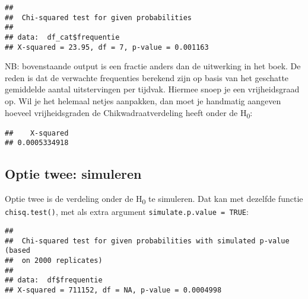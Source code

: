 \documentclass[]{book}
\newenvironment{Shaded}{\begin{snugshade}}{\end{snugshade}}
\newcommand{\KeywordTok}[1]{\textcolor[rgb]{0.13,0.29,0.53}{\textbf{{#1}}}}
\newcommand{\DataTypeTok}[1]{\textcolor[rgb]{0.13,0.29,0.53}{{#1}}}
\newcommand{\DecValTok}[1]{\textcolor[rgb]{0.00,0.00,0.81}{{#1}}}
\newcommand{\StringTok}[1]{\textcolor[rgb]{0.31,0.60,0.02}{{#1}}}
\newcommand{\OtherTok}[1]{\textcolor[rgb]{0.56,0.35,0.01}{{#1}}}
\newcommand{\NormalTok}[1]{{#1}}
\theoremstyle{definition}
\theoremstyle{definition}
\theoremstyle{definition}
\theoremstyle{remark}
\begin{document}
\begin{verbatim}
## 
##  Chi-squared test for given probabilities
## 
## data:  df_cat$frequentie
## X-squared = 23.95, df = 7, p-value = 0.001163
\end{verbatim}

NB: bovenstaande output is een fractie anders dan de uitwerking in het
boek. De reden is dat de verwachte frequenties berekend zijn op basis
van het geschatte gemiddelde aantal uitstervingen per tijdvak. Hiermee
snoep je een vrijheidsgraad op. Wil je het helemaal netjes aanpakken,
dan moet je handmatig aangeven hoeveel vrijheidsgraden de
Chikwadraatverdeling heeft onder de H\textsubscript{0}:

\begin{Shaded}
\end{Shaded}

\begin{verbatim}
##    X-squared 
## 0.0005334918
\end{verbatim}

\subsection{Optie twee: simuleren}\label{optie-twee-simuleren}

Optie twee is de verdeling onder de H\textsubscript{0} te simuleren. Dat
kan met dezelfde functie \texttt{chisq.test()}, met als extra argument
\texttt{simulate.p.value\ =\ TRUE}:

\begin{Shaded}
\end{Shaded}

\begin{verbatim}
## 
##  Chi-squared test for given probabilities with simulated p-value (based
##  on 2000 replicates)
## 
## data:  df$frequentie
## X-squared = 711152, df = NA, p-value = 0.0004998
\end{verbatim}
\end{document}
